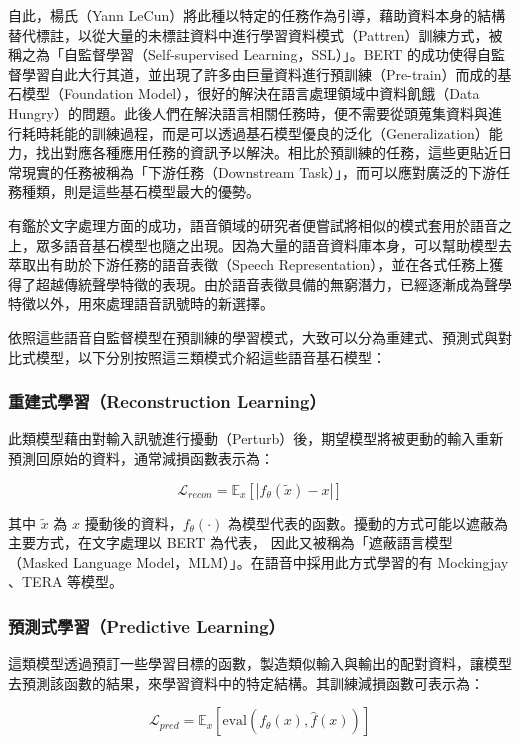 自此，楊氏（Yann LeCun）將此種以特定的任務作為引導，藉助資料本身的結構替代標註，以從大量的未標註資料中進行學習資料模式（Pattren）訓練方式，被稱之為「自監督學習（Self-supervised Learning，SSL）」。BERT 的成功使得自監督學習自此大行其道，並出現了許多由巨量資料進行預訓練（Pre-train）而成的基石模型（Foundation Model），很好的解決在語言處理領域中資料飢餓（Data Hungry）的問題。此後人們在解決語言相關任務時，便不需要從頭蒐集資料與進行耗時耗能的訓練過程，而是可以透過基石模型優良的泛化（Generalization）能力，找出對應各種應用任務的資訊予以解決。相比於預訓練的任務，這些更貼近日常現實的任務被稱為「下游任務（Downstream Task）」，而可以應對廣泛的下游任務種類，則是這些基石模型最大的優勢。

有鑑於文字處理方面的成功，語音領域的研究者便嘗試將相似的模式套用於語音之上，眾多語音基石模型也隨之出現。因為大量的語音資料庫本身，可以幫助模型去萃取出有助於下游任務的語音表徵（Speech Representation），並在各式任務上獲得了超越傳統聲學特徵的表現。由於語音表徵具備的無窮潛力，已經逐漸成為聲學特徵以外，用來處理語音訊號時的新選擇。

依照這些語音自監督模型在預訓練的學習模式，大致可以分為重建式、預測式與對比式模型，以下分別按照這三類模式介紹這些語音基石模型：

\subsubsection{重建式學習（Reconstruction Learning）}

此類模型藉由對輸入訊號進行擾動（Perturb）後，期望模型將被更動的輸入重新預測回原始的資料，通常減損函數表示為：

$$\mathcal{L}_{recon} = \mathbb{E}_x[|f_\theta(\tilde{x}) - x|]$$

其中 $\tilde{x}$ 為 $x$ 擾動後的資料，$f_\theta(\cdot)$ 為模型代表的函數。擾動的方式可能以遮蔽為主要方式，在文字處理以 BERT 為代表， 因此又被稱為「遮蔽語言模型（Masked Language Model，MLM）」。在語音中採用此方式學習的有 Mockingjay \cite{liu_mockingjay_2019}、TERA \cite{t_tera_2021} 等模型。  %

\subsubsection{預測式學習（Predictive Learning）}

這類模型透過預訂一些學習目標的函數，製造類似輸入與輸出的配對資料，讓模型去預測該函數的結果，來學習資料中的特定結構。其訓練減損函數可表示為：

$$\mathcal{L}_{pred} = \mathbb{E}_x[\text{eval}(f_\theta(x), \hat{f}(x))]$$

